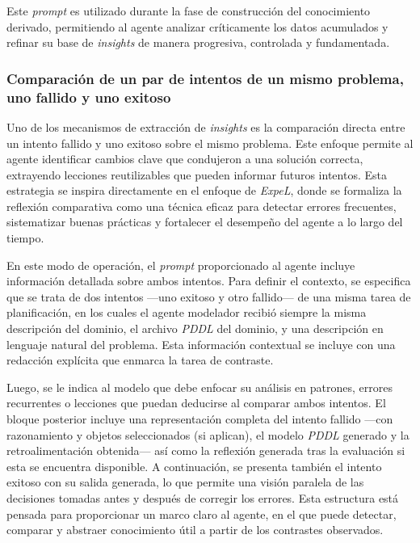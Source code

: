 Este \textit{prompt} es utilizado durante la fase de construcción del conocimiento derivado, permitiendo al agente analizar críticamente los datos acumulados y refinar su base de \textit{insights} de manera progresiva, controlada y fundamentada.

\subsubsection{Comparación de un par de intentos de un mismo problema, uno fallido y uno exitoso}

Uno de los mecanismos de extracción de \textit{insights} es la comparación directa entre un intento fallido y uno exitoso sobre el mismo problema. Este enfoque permite al agente identificar cambios clave que condujeron a una solución correcta, extrayendo lecciones reutilizables que pueden informar futuros intentos. Esta estrategia se inspira directamente en el enfoque de \textit{ExpeL}, donde se formaliza la reflexión comparativa como una técnica eficaz para detectar errores frecuentes, sistematizar buenas prácticas y fortalecer el desempeño del agente a lo largo del tiempo.

En este modo de operación, el \textit{prompt} proporcionado al agente incluye información detallada sobre ambos intentos. Para definir el contexto, se especifica que se trata de dos intentos —uno exitoso y otro fallido— de una misma tarea de planificación, en los cuales el agente modelador recibió siempre la misma descripción del dominio, el archivo \textit{PDDL} del dominio, y una descripción en lenguaje natural del problema. Esta información contextual se incluye con una redacción explícita que enmarca la tarea de contraste.

Luego, se le indica al modelo que debe enfocar su análisis en patrones, errores recurrentes o lecciones que puedan deducirse al comparar ambos intentos. El bloque posterior incluye una representación completa del intento fallido —con razonamiento y objetos seleccionados (si aplican), el modelo \textit{PDDL} generado y la retroalimentación obtenida— así como la reflexión generada tras la evaluación si esta se encuentra disponible. A continuación, se presenta también el intento exitoso con su salida generada, lo que permite una visión paralela de las decisiones tomadas antes y después de corregir los errores. Esta estructura está pensada para proporcionar un marco claro al agente, en el que puede detectar, comparar y abstraer conocimiento útil a partir de los contrastes observados.

